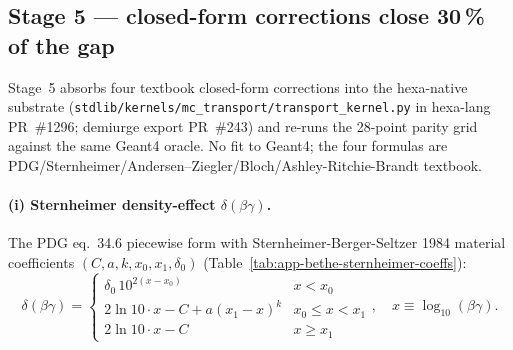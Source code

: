 \noindent{}

\subsection{Stage 5 --- closed-form corrections close 30\,\% of the gap}
\label{app:bethe-stage5}

Stage~5 absorbs four textbook closed-form corrections into the
hexa-native substrate
(\verb|stdlib/kernels/mc_transport/transport_kernel.py| in hexa-lang
PR~\#1296; demiurge export PR~\#243) and re-runs the 28-point parity grid
against the same Geant4 oracle. No fit to Geant4; the four formulas are
PDG/Sternheimer/Andersen--Ziegler/Bloch/Ashley-Ritchie-Brandt textbook.

\paragraph{(i) Sternheimer density-effect $\delta(\beta\gamma)$.} The PDG
eq.~34.6 piecewise form with Sternheimer-Berger-Seltzer 1984 material
coefficients $(C, a, k, x_0, x_1, \delta_0)$
(Table~\ref{tab:app-bethe-sternheimer-coeffs}):
\begin{equation}
\delta(\beta\gamma) = \begin{cases}
\delta_0\,10^{2(x-x_0)} & x < x_0 \\
2\ln 10\cdot x - C + a(x_1-x)^k & x_0 \le x < x_1 \\
2\ln 10\cdot x - C & x \ge x_1
\end{cases}, \quad x \equiv \log_{10}(\beta\gamma).
\label{eq:app-sternheimer}
\end{equation}

